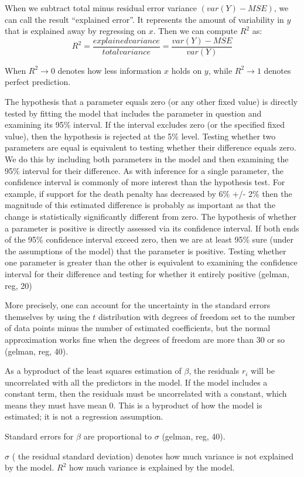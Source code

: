 \documentclass{article}
\begin{document}
When we subtract total minus residual error variance $ ( var(Y) - MSE )$, we can call the result ``explained error''. It represents the amount of variability in $y$ that is explained away by regressing on $x$. Then we can compute $R^2$ as: 
\begin{equation}
   R^2 = \frac{explained variance}{total variance} = \frac{var(Y) - MSE}{var(Y)}
\end{equation}

When $R^2 \rightarrow 0$ denotes how less information $x$ holds on $y$, while $R^2 \rightarrow 1$ denotes perfect prediction.

The hypothesis that a parameter equals zero (or any other fixed value) is directly
tested by fitting the model that includes the parameter in question and examining
its 95\% interval. If the interval excludes zero (or the specified fixed value), then the
hypothesis is rejected at the 5\% level.
Testing whether two parameters are equal is equivalent to testing whether their
difference equals zero. We do this by including both parameters in the model and
then examining the 95\% interval for their difference. As with inference for a single
parameter, the confidence interval is commonly of more interest than the hypothesis
test. For example, if support for the death penalty has decreased by 6\% +/- 2\%
then the magnitude of this estimated difference is probably as important as that
the change is statistically significantly different from zero.
The hypothesis of whether a parameter is positive is directly assessed via its
confidence interval. If both ends of the 95\% confidence interval exceed zero, then
we are at least 95\% sure (under the assumptions of the model) that the parameter
is positive. Testing whether one parameter is greater than the other is equivalent
to examining the confidence interval for their difference and testing for whether it entirely positive (gelman, reg, 20)

More precisely, one can account for the uncertainty in the standard errors themselves by using the $t$ distribution with degrees of freedom set to the number of data points minus the number of estimated coefficients, but the normal approximation works fine when the degrees of freedom are more than 30 or so (gelman, reg, 40).

As a byproduct of the least squares estimation of $\beta$, the residuals $r_i$ will be uncorrelated with all the predictors in the model. If the model includes a constant term, then the residuals must be uncorrelated with a constant, which means they must have mean 0. This is a byproduct of how the model is estimated; it is not a regression assumption. 

Standard errors for $\beta$ are proportional to $\sigma$  (gelman, reg, 40).

$\hat{\sigma}$ ( the residual standard deviation) denotes how much variance is not explained by the model.
$R^2$ how much variance is explained by the model.
\end{document}
